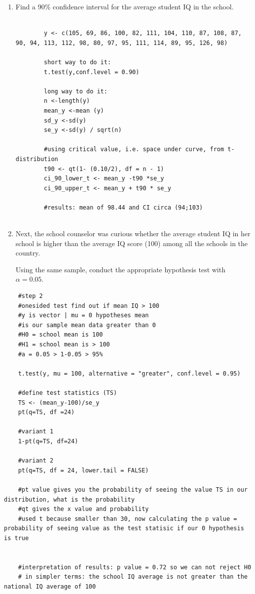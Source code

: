\documentclass[12pt,letterpaper]{article}
\begin{document}
\begin{enumerate}
	\item Find a 90\% confidence interval for the average student IQ in the school.
	
	\begin{verbatim}
		
		y <- c(105, 69, 86, 100, 82, 111, 104, 110, 87, 108, 87, 90, 94, 113, 112, 98, 80, 97, 95, 111, 114, 89, 95, 126, 98)
		
		short way to do it:
		t.test(y,conf.level = 0.90)
		
		long way to do it:
		n <-length(y)
		mean_y <-mean (y)
		sd_y <-sd(y)
		se_y <-sd(y) / sqrt(n)
		
		#using critical value, i.e. space under curve, from t-distribution 
		t90 <- qt(1- (0.10/2), df = n - 1)
		ci_90_lower_t <- mean_y -t90 *se_y
		ci_90_upper_t <- mean_y + t90 * se_y
		
		#results: mean of 98.44 and CI circa (94;103)
	
		\end{verbatim}
	
	\item Next, the school counselor was curious  whether  the average student IQ in her school is higher than the average IQ score (100) among all the schools in the country.
		
	\noindent Using the same sample, conduct the appropriate hypothesis test with $\alpha=0.05$.
\end{enumerate}

	\begin{verbatim}
	#step 2
	#onesided test find out if mean IQ > 100 
	#y is vector | mu = 0 hypotheses mean
	#is our sample mean data greater than 0
	#H0 = school mean is 100
	#H1 = school mean is > 100
	#a = 0.05 > 1-0.05 > 95%
	
	t.test(y, mu = 100, alternative = "greater", conf.level = 0.95)
	
	#define test statistics (TS)
	TS <- (mean_y-100)/se_y
	pt(q=TS, df =24)
	
	#variant 1
	1-pt(q=TS, df=24)
	
	#variant 2
	pt(q=TS, df = 24, lower.tail = FALSE)
	
	#pt value gives you the probability of seeing the value TS in our distribution, what is the probability
	#qt gives the x value and probability 
	#used t because smaller than 30, now calculating the p value = probability of seeing value as the test statisic if our 0 hypothesis is true
	
	
	#interpretation of results: p value = 0.72 so we can not reject H0
	# in simpler terms: the school IQ average is not greater than the national IQ average of 100
\end{verbatim}
\end{document}
